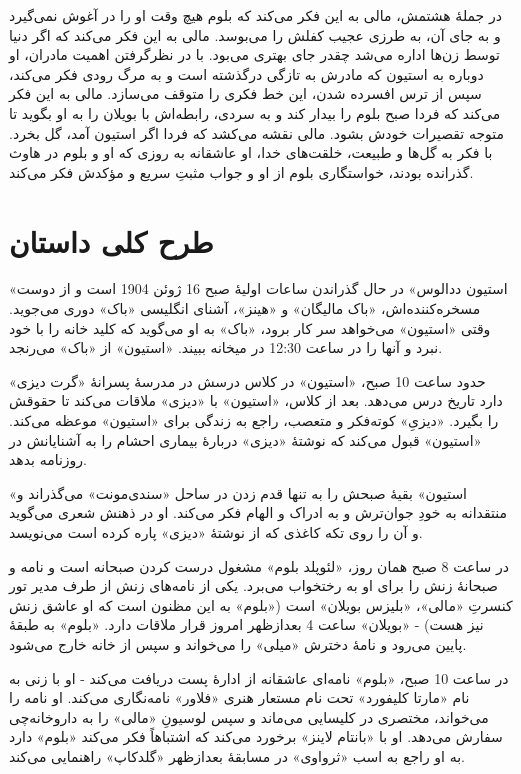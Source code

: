 \documentclass[12pt]{book}
\newcommand{\noun}[1]{«{#1}»}
\begin{document}
    در جملۀ هشتمش، مالی به این فکر می‌کند که بلوم هیچ وقت او را در آغوش نمی‌گیرد و به جای آن، به طرزی عجیب کفلش را می‌بوسد. مالی به این فکر می‌کند که اگر دنیا توسط زن‌ها اداره می‌شد چقدر جای بهتری می‌بود. با در نظرگرفتن اهمیت مادران، او دوباره به استیون که مادرش به تازگی درگذشته است و به مرگ رودی فکر می‌کند، سپس از ترس افسرده شدن، این خط فکری را متوقف می‌سازد. مالی به این فکر می‌کند که فردا صبح بلوم را بیدار کند و به سردی، رابطه‌اش با بویلان را به او بگوید تا متوجه تقصیرات خودش بشود. مالی نقشه می‌کشد که فردا اگر استیون آمد، گل بخرد. با فکر به گل‌ها و طبیعت، خلقت‌های خدا، او عاشقانه به روزی که او و بلوم در هاوث گذرانده بودند، خواستگاری‌ بلوم از او و جواب مثبتِ سریع و مؤکدش فکر می‌کند.

    \part{طرح کلی داستان}
    \noun{استیون ددالوس} در حال گذراندن ساعات اولیۀ صبح 16 ژوئن 1904 است و از دوست مسخره‌کننده‌اش، \noun{باک مالیگان} و \noun{هینز}، آشنای انگلیسی \noun{باک} دوری می‌جوید. وقتی \noun{استیون} می‌خواهد سر کار برود، \noun{باک} به او می‌گوید که کلید خانه را با خود نبرد و آنها را در ساعت 12:30 در میخانه ببیند. \noun{استیون} از \noun{باک} می‌رنجد.

    حدود ساعت 10 صبح، \noun{استیون} در کلاس درسش در مدرسۀ پسرانۀ \noun{گرت دیزی} دارد تاریخ درس می‌دهد. بعد از کلاس، \noun{استیون} با \noun{دیزی} ملاقات می‌کند تا حقوقش را بگیرد. \noun{دیزیِ} کوته‌فکر و متعصب، راجع به زندگی برای \noun{استیون} موعظه می‌کند. \noun{استیون} قبول می‌کند که نوشتۀ \noun{دیزی} دربارۀ بیماری احشام را به آشنایانش در روزنامه بدهد.

    \noun{استیون} بقیۀ صبحش را به تنها قدم زدن در ساحل \noun{سندی‌مونت} می‌گذراند و منتقدانه به خودِ جوان‌ترش و به ادراک و الهام فکر می‌کند. او در ذهنش شعری می‌گوید و آن را روی تکه کاغذی که از نوشتۀ \noun{دیزی} پاره کرده است می‌نویسد.

    در ساعت 8 صبح همان روز، \noun{لئوپلد بلوم} مشغول درست کردن صبحانه است و نامه و صبحانۀ زنش را برای او به رختخواب می‌برد. یکی از نامه‌های زنش از طرف مدیر تور کنسرتِ \noun{مالی}، \noun{بلیزس بویلان} است (\noun{بلوم} به این مظنون است که او عاشق زنش نیز هست) - \noun{بویلان} ساعت 4 بعدازظهر امروز قرار ملاقات دارد. \noun{بلوم} به طبقۀ پایین می‌رود و نامۀ دخترش \noun{میلی} را می‌خواند و سپس از خانه خارج می‌شود.

    در ساعت 10 صبح، \noun{بلوم} نامه‌ای عاشقانه از ادارۀ پست دریافت می‌کند - او با زنی به نام \noun{مارتا کلیفورد} تحت نام مستعار هنری \noun{فلاور} نامه‌نگاری می‌کند. او نامه را می‌خواند، مختصری در کلیسایی می‌ماند و سپس لوسیونِ \noun{مالی} را به داروخانه‌چی سفارش می‌دهد. او با \noun{بانتام لاینز} برخورد می‌کند که اشتباهاً فکر می‌کند \noun{بلوم} دارد به او راجع به اسب \noun{ثرواوی} در مسابقۀ بعدازظهر \noun{گلدکاپ} راهنمایی می‌کند.
\end{document}
